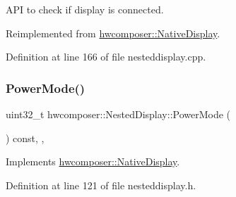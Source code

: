 A\+PI to check if display is connected. 

Reimplemented from \mbox{\hyperlink{classhwcomposer_1_1NativeDisplay_af22694b3396866fd4f003755f4951b18}{hwcomposer\+::\+Native\+Display}}.



Definition at line 166 of file nesteddisplay.\+cpp.


\begin{DoxyCode}{0}
\end{DoxyCode}
\mbox{\label{classhwcomposer_1_1NestedDisplay_a7f08b439ab7e67ba6344471b9efe7d62}} 
\subsubsection{\texorpdfstring{Power\+Mode()}{PowerMode()}}
{\footnotesize\ttfamily uint32\+\_\+t hwcomposer\+::\+Nested\+Display\+::\+Power\+Mode (\begin{DoxyParamCaption}{ }\end{DoxyParamCaption}) const\hspace{0.3cm}{\ttfamily [inline]}, {\ttfamily [override]}, {\ttfamily [virtual]}}



Implements \mbox{\hyperlink{classhwcomposer_1_1NativeDisplay_af03b22112e421559c5f59837a2209716}{hwcomposer\+::\+Native\+Display}}.



Definition at line 121 of file nesteddisplay.\+h.


\begin{DoxyCode}{0}
\end{DoxyCode}
\mbox{\label{classhwcomposer_1_1NestedDisplay_af7983c8f6bafff1ab2077f7b3d38a0de}} 
